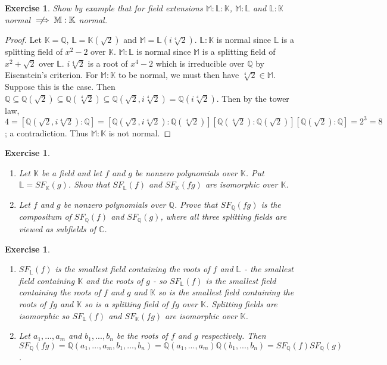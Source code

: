 \documentclass{article}
\newtheorem{exercise}[theorem]{Exercise}
\begin{document}
\begin{exercise}
Show by example that for field extensions $\mathbb{M}:\mathbb{L}:\mathbb{K}$, $\mathbb{M}:\mathbb{L}$ and $\mathbb{L}:\mathbb{K}$ normal $\centernot\implies\mathbb{M}:\mathbb{K}$ normal.
\end{exercise}
\begin{proof}
Let $\mathbb{K}=\mathbb{Q}$, $\mathbb{L}=\mathbb{K}(\sqrt{2})$ and $\mathbb{M}=\mathbb{L}(i\sqrt[4]{2})$. $\mathbb{L}:\mathbb{K}$ is normal since $\mathbb{L}$ is a splitting field of $x^2-2$ over $\mathbb{K}$. $\mathbb{M}:\mathbb{L}$ is normal since $\mathbb{M}$ is a splitting field of $x^2+\sqrt{2}$ over $\mathbb{L}$. $i\sqrt[4]{2}$ is a root of $x^4-2$ which is irreducible over $\mathbb{Q}$ by Eisenstein's criterion. For $\mathbb{M}:\mathbb{K}$ to be normal, we must then have $\sqrt[4]{2}\in\mathbb{M}$. Suppose this is the case. Then $\mathbb{Q}\subseteq\mathbb{Q}(\sqrt{2})\subseteq\mathbb{Q}(\sqrt[4]{2})\subseteq\mathbb{Q}(\sqrt{2},i\sqrt[4]{2})=\mathbb{Q}(i\sqrt[4]{2})$. Then by the tower law, $4=[\mathbb{Q}(\sqrt{2},i\sqrt[4]{2}):\mathbb{Q}]=[\mathbb{Q}(\sqrt{2},i\sqrt[4]{2}):\mathbb{Q}(\sqrt[4]{2})][\mathbb{Q}(\sqrt[4]{2}):\mathbb{Q}(\sqrt{2})][\mathbb{Q}(\sqrt{2}):\mathbb{Q}]=2^3=8$; a contradiction. Thus $\mathbb{M}:\mathbb{K}$ is not normal.
\end{proof}

\begin{exercise}
\begin{enumerate}[label=(\roman*)]
    \item Let $\mathbb{K}$ be a field and let $f$ and $g$ be nonzero polynomials over $\mathbb{K}$. Put $\mathbb{L}=SF_\mathbb{K}(g)$. Show that $SF_\mathbb{L}(f)$ and $SF_\mathbb{K}(fg)$ are isomorphic over $\mathbb{K}$.
    \item Let $f$ and $g$ be nonzero polynomials over $\mathbb{Q}$. Prove that $SF_\mathbb{Q}(fg)$ is the compositum of $SF_\mathbb{Q}(f)$ and $SF_\mathbb{Q}(g)$, where all three splitting fields are viewed as subfields of $\mathbb{C}$.
\end{enumerate}
\end{exercise}

\begin{exercise}
\begin{enumerate}[label=(\roman*)]
    \item $SF_\mathbb{L}(f)$ is the smallest field containing the roots of $f$ and $\mathbb{L}$ - the smallest field containing $\mathbb{K}$ and the roots of $g$ - so $SF_\mathbb{L}(f)$ is the smallest field containing the roots of $f$ and $g$ and $\mathbb{K}$ so is the smallest field containing the roots of $fg$ and $\mathbb{K}$ so is a splitting field of $fg$ over $\mathbb{K}$. Splitting fields are isomorphic so $SF_\mathbb{L}(f)$ and $SF_\mathbb{K}(fg)$ are isomorphic over $\mathbb{K}$.
    \item Let $a_1,...,a_m$ and $b_1,...,b_n$ be the roots of $f$ and $g$ respectively. Then $SF_\mathbb{Q}(fg)=\mathbb{Q}(a_1,...,a_m,b_1,...,b_n)=\mathbb{Q}(a_1,...,a_m)\mathbb{Q}(b_1,...,b_n)=SF_\mathbb{Q}(f)SF_\mathbb{Q}(g)$.
\end{enumerate}
\end{exercise}
\end{document}
